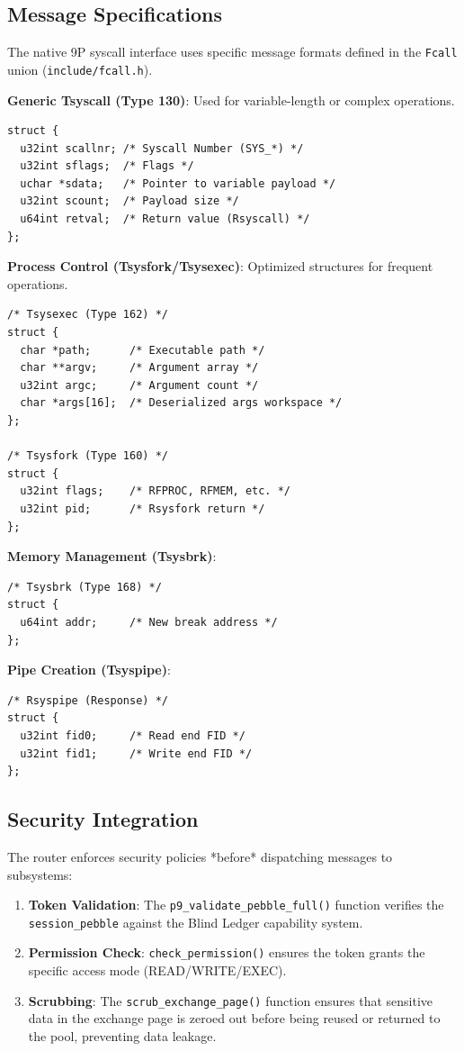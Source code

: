 \documentclass[11pt,letterpaper]{article}
\begin{document}
\subsection{Message Specifications}

The native 9P syscall interface uses specific message formats defined in the \texttt{Fcall} union (\texttt{include/fcall.h}).

\textbf{Generic Tsyscall (Type 130)}:
Used for variable-length or complex operations.
\begin{lstlisting}
struct {
  u32int scallnr; /* Syscall Number (SYS_*) */
  u32int sflags;  /* Flags */
  uchar *sdata;   /* Pointer to variable payload */
  u32int scount;  /* Payload size */
  u64int retval;  /* Return value (Rsyscall) */
};
\end{lstlisting}

\textbf{Process Control (Tsysfork/Tsysexec)}:
Optimized structures for frequent operations.
\begin{lstlisting}
/* Tsysexec (Type 162) */
struct {
  char *path;      /* Executable path */
  char **argv;     /* Argument array */
  u32int argc;     /* Argument count */
  char *args[16];  /* Deserialized args workspace */
};

/* Tsysfork (Type 160) */
struct {
  u32int flags;    /* RFPROC, RFMEM, etc. */
  u32int pid;      /* Rsysfork return */
};
\end{lstlisting}

\textbf{Memory Management (Tsysbrk)}:
\begin{lstlisting}
/* Tsysbrk (Type 168) */
struct {
  u64int addr;     /* New break address */
};
\end{lstlisting}

\textbf{Pipe Creation (Tsyspipe)}:
\begin{lstlisting}
/* Rsyspipe (Response) */
struct {
  u32int fid0;     /* Read end FID */
  u32int fid1;     /* Write end FID */
};
\end{lstlisting}

\subsection{Security Integration}

The router enforces security policies *before* dispatching messages to subsystems:

\begin{enumerate}
\item \textbf{Token Validation}: The \texttt{p9_validate_pebble_full()} function verifies the \texttt{session_pebble} against the Blind Ledger capability system.
\item \textbf{Permission Check}: \texttt{check_permission()} ensures the token grants the specific access mode (READ/WRITE/EXEC).
\item \textbf{Scrubbing}: The \texttt{scrub_exchange_page()} function ensures that sensitive data in the exchange page is zeroed out before being reused or returned to the pool, preventing data leakage.
\end{enumerate}
\end{document}
